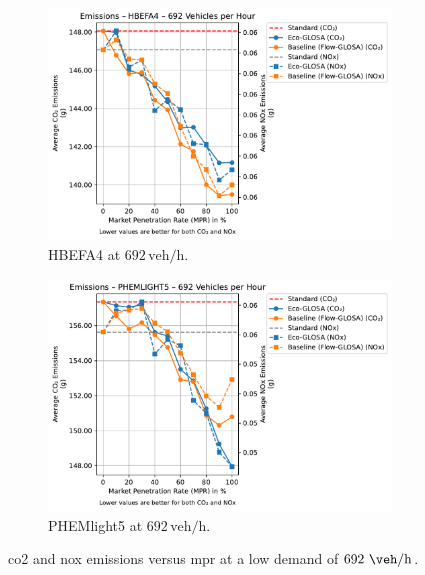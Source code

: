 \begin{figure}[htbp]
  \centering
  \begin{subfigure}[b]{0.98\textwidth}
    \includegraphics[width=\textwidth]{data/img/Emissions/Emissions_HBEFA4_Cars692.pdf}
    \caption{HBEFA4 at $692\,\mathrm{veh/h}$.}
    \label{fig:Emis_692_HBEFA4}
  \end{subfigure}
  \begin{subfigure}[b]{0.98\textwidth}
    \includegraphics[width=\textwidth]{data/img/Emissions/Emissions_PHEMLIGHT5_Cars692.pdf}
    \caption{PHEMlight5 at $692\,\mathrm{veh/h}$.}
    \label{fig:Emis_692_PHEM}
  \end{subfigure}
  \caption[\ac{co2} and \ac{nox} emissions vs. \ac{mpr} at $692~\unit{\veh\per\hour}$]{\ac{co2} and \ac{nox} emissions versus \ac{mpr} at a low demand of $692~\unit{\veh\per\hour}$.}
\label{fig:Emis_692}
\end{figure}

